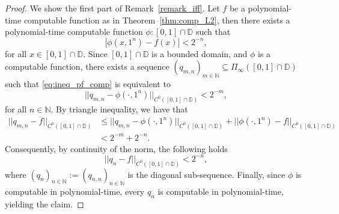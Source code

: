 \documentclass[pdflatex]{sn-jnl}%
\begin{document}
\begin{proof}
We show the first part of Remark~\ref{remark_iff}.
     Let $f$ be a polynomial-time computable function as in Theorem~\ref{thm:comp_L2}, then there exists a polynomial-time computable function $\phi:[0,1]\cap\mathbb{D}$ such that 
    \begin{equation}\label{eq:ineq_pf_comp}
        |\phi(x,1^n)-f(x)|<2^{-n},
    \end{equation}
    for all $x\in [0,1]\cap\mathbb{D}$. Since  $[0,1]\cap\mathbb{D}$ is a bounded domain, and $\phi$ is a computable function, there exists a sequence $(q_{m,n})_{m\in \mathbb{N}}\subseteq \Pi_\infty([0,1]\cap\mathbb{D})$ such that 
    \eqref{eq:ineq_pf_comp} is equivalent to 
    \begin{equation}\label{eq:ineq_pf_comp_2}
        ||q_{m,n}-\phi(\cdot,1^n)||_{C^0([0,1]\cap{\mathbb{D}})}<2^{-m},
    \end{equation}
    for all $n\in \mathbb{N}$. By triangle inequality, we have that
    \begin{align*}
        ||q_{m,n}-f||_{C^0([0,1]\cap\mathbb{D})}&\leq ||q_{m,n}-\phi(\cdot,1^n)||_{C^0([0,1]\cap\mathbb{D})}+||\phi(\cdot,1^n)-f||_{C^0([0,1]\cap\mathbb{D})}\\&
        <2^{-m}+2^{-n}.
    \end{align*}
    Consequently, by continuity of the norm, the following holds
    \begin{equation}
        ||q_{n}-f||_{C^0([0,1]\cap\mathbb{D})}<2^{-n},
    \end{equation}
    where $(q_n)_{n\in \mathbb{N}}:=(q_{n,n})_{n\in \mathbb{N}}$ is the diagonal sub-sequence. Finally, since $\phi$ is computable in polynomial-time, every $q_n$ is computable in polynomial-time, yielding the claim.
\end{proof}
\end{document}
